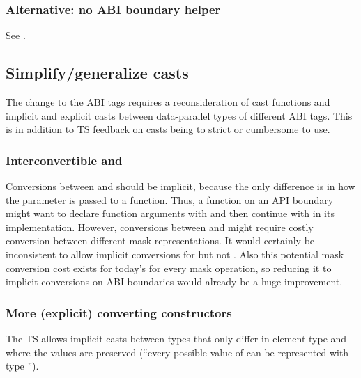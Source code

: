 \subsubsection{Alternative: no ABI boundary helper}

See .

\subsection{Simplify/generalize casts}\label{sec:casts}

The change to the ABI tags requires a reconsideration of cast functions and
implicit and explicit casts between data-parallel types of different ABI tags.
This is in addition to TS feedback on casts being to strict or cumbersome to use.

\subsubsection{Interconvertible  and }

Conversions between  and  should be implicit, because the only difference is in how the parameter is
passed to a function.
Thus, a function on an API boundary might want to declare function arguments
with  and then continue with  in its
implementation.
However, conversions between  and
 might require costly conversion between
different mask representations.
It would certainly be inconsistent to allow implicit conversions for
 but not .
Also this potential mask conversion cost exists for today's
\stdx\simdabi{} for every mask operation, so
reducing it to implicit conversions on ABI boundaries would already be a huge
improvement.

\subsubsection{More (explicit) converting constructors}

The TS allows implicit casts between  types that only
differ in element type and where the values are preserved (“every possible
value of  can be represented with type ”).

